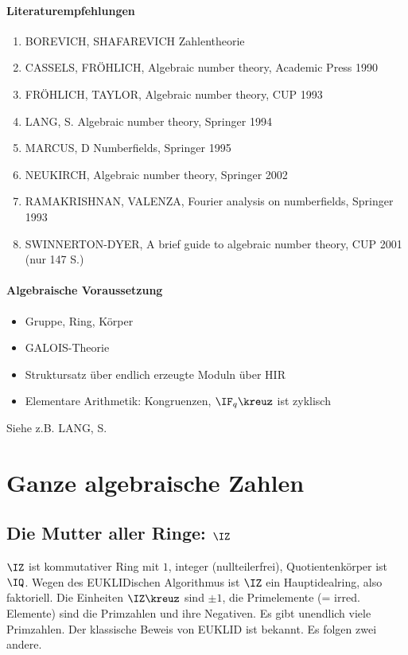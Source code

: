 
\renewcommand{\lecdate}{21.10.14}
\newpage
\paragraph{Literaturempfehlungen}
\begin{enumerate}[1]
\item BOREVICH, SHAFAREVICH Zahlentheorie
\item CASSELS, FRÖHLICH, Algebraic number theory, Academic Press 1990
\item FRÖHLICH, TAYLOR, Algebraic number theory, CUP 1993
\item LANG, S. Algebraic number theory, Springer 1994
\item MARCUS, D Numberfields, Springer 1995
\item NEUKIRCH, Algebraic number theory, Springer 2002
\item RAMAKRISHNAN, VALENZA, Fourier analysis on numberfields, Springer 1993
\item SWINNERTON-DYER, A brief guide to algebraic number theory, CUP 2001 (nur 147 S.)
\end{enumerate}

\paragraph{Algebraische Voraussetzung}
\begin{itemize}
\item Gruppe, Ring, Körper
\item GALOIS-Theorie
\item Struktursatz über endlich erzeugte Moduln über HIR
\item Elementare Arithmetik: Kongruenzen, $\IF_q\kreuz$ ist zyklisch
\end{itemize}

Siehe z.B. LANG, S.

\newpage
\section{Ganze algebraische Zahlen}
\subsection{Die Mutter aller Ringe: $\IZ$}
$\IZ$ ist kommutativer Ring mit $1$, integer (nullteilerfrei), Quotientenkörper ist $\IQ$.
Wegen des \mbox{EUKLIDischen} Algorithmus ist $\IZ$ ein Hauptidealring, also faktoriell.
Die Einheiten $\IZ\kreuz$ sind $\pm 1$, die Primelemente (= irred. Elemente) sind die Primzahlen und ihre Negativen. Es gibt unendlich viele Primzahlen.
Der klassische Beweis von EUKLID  ist bekannt. Es folgen zwei andere.

